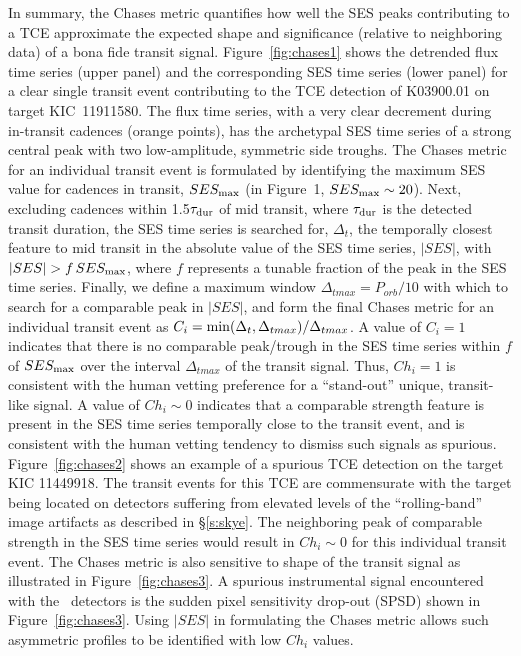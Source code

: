 In summary, the Chases metric quantifies how well the SES peaks contributing to a TCE approximate the expected shape and significance (relative to neighboring data) of a bona fide transit signal.  Figure~\ref{fig:chases1} shows the detrended flux time series (upper panel) and the corresponding SES time series (lower panel) for a clear single transit event contributing to the TCE detection of K03900.01 on target KIC~11911580.  The flux time series, with a very clear decrement during in-transit cadences (orange points), has the archetypal SES time series of a strong central peak with two low-amplitude, symmetric side troughs.  The Chases metric for an individual transit event is formulated by identifying the maximum SES value for cadences in transit, $SES_{\rm max}$ (in Figure~1, $SES_{\rm max}\sim20$).  Next, excluding cadences within 1.5$\tau_{\rm dur}$ of mid transit, where $\tau_{\rm dur}$ is the detected transit duration, the SES time series is searched for, $\Delta_{t}$, the temporally closest feature to mid transit in the absolute value of the SES time series, $\lvert SES \rvert$, with  $\lvert SES \rvert>f\, SES_{\rm max}$, where $f$ represents a tunable fraction of the peak in the SES time series.  Finally, we define a maximum window $\Delta_{tmax}=P_{orb}/10$ with which to search for a comparable peak in $\lvert SES \rvert$, and form the final Chases metric for an individual transit event as $C_{i} = {\rm min}(\Delta_{t},\Delta_{tmax})/\Delta_{tmax}$.  A value of $C_{i}=1$ indicates that there is no comparable peak/trough in the SES time series within $f$ of $SES_{\rm max}$ over the interval $\Delta_{tmax}$ of the transit signal.  Thus, $Ch_{i}=1$ is consistent with the human vetting preference for a ``stand-out'' unique, transit-like signal.  A value of $Ch_{i}\sim0$ indicates that a comparable strength feature is present in the SES time series temporally close to the transit event, and is consistent with the human vetting tendency to dismiss such signals as spurious.  Figure~\ref{fig:chases2} shows an example of a spurious TCE detection on the target KIC 11449918.  The transit events for this TCE are commensurate with the target being located on detectors suffering from elevated levels of the ``rolling-band'' image artifacts as described in \S\ref{s:skye}.  The neighboring peak of comparable strength in the SES time series would result in $Ch_{i}\sim0$ for this individual transit event.  The Chases metric is also sensitive to shape of the transit signal as illustrated in Figure~\ref{fig:chases3}. A spurious instrumental signal encountered with the \kepler\ detectors is the sudden pixel sensitivity drop-out (SPSD) shown in Figure~\ref{fig:chases3}.  Using $\lvert SES \rvert$ in formulating the Chases metric allows such asymmetric profiles to be identified with low $Ch_{i}$ values.

